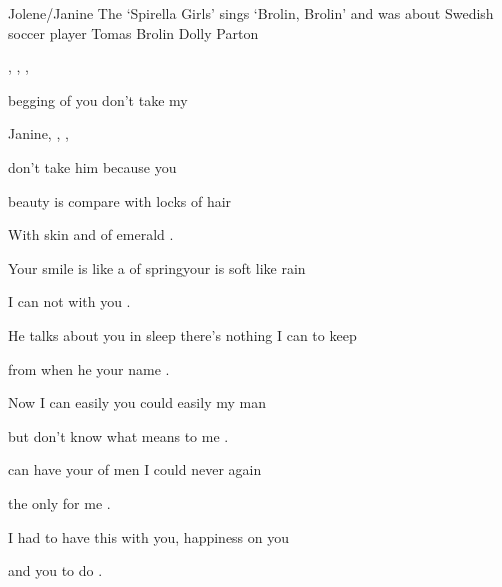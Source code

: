 \begin{SBSong}{Jolene/Janine}
  {The `Spirella Girls' sings `Brolin, Brolin' and was about Swedish soccer player Tomas Brolin}
  {Dolly Parton}
  \begin{SBChorus}
    , , , 

     begging of you  don't take my 

    Janine, , , 

     don't take him  because you 
  \end{SBChorus}
  \begin{SBVerse}
     beauty is  compare with  locks of  hair

    With  skin and  of emerald .

    Your smile is like a  of spring\WBLineBrk your  is soft like  rain

     I can not  with you .

    He talks about you in  sleep  there's nothing I can  to keep

    from  when he  your name .

    Now I can easily   you could easily  my man

    but  don't know what  means to me .
  \end{SBVerse}
  \begin{SBVerse}
     can have your  of men  I could never  again

     the only  for me .

    I had to have this  with you,  happiness  on you

    and  you  to do .
  \end{SBVerse}
\end{SBSong}
